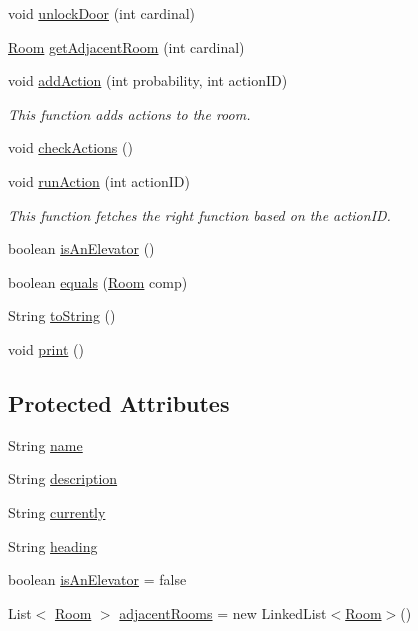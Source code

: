 \begin{DoxyCompactItemize}
\item 
void \hyperlink{classRoom_ace2ee11dd317462ad17dc457109a30f5}{unlock\+Door} (int cardinal)
\item 
\hyperlink{classRoom}{Room} \hyperlink{classRoom_ae10de76a88deb65efbbcd42d1557da68}{get\+Adjacent\+Room} (int cardinal)
\item 
void \hyperlink{classRoom_ab5fed82dacde130f70941779b0b6c7fb}{add\+Action} (int probability, int action\+I\+D)
\begin{DoxyCompactList}\small\item\em This function adds actions to the room. \end{DoxyCompactList}\item 
void \hyperlink{classRoom_acf497ba6df7779bfbc4786dd069d84ef}{check\+Actions} ()
\item 
void \hyperlink{classRoom_a17dc052da1d8f76adf886352d3523d9f}{run\+Action} (int action\+I\+D)
\begin{DoxyCompactList}\small\item\em This function fetches the right function based on the action\+I\+D. \end{DoxyCompactList}\item 
boolean \hyperlink{classRoom_aef1fd9dd031e99eb01947603bca26918}{is\+An\+Elevator} ()
\item 
boolean \hyperlink{classRoom_a2d753b78a122a29c0a6bf9da4fd2dd6b}{equals} (\hyperlink{classRoom}{Room} comp)
\item 
String \hyperlink{classRoom_a257d76391ce0c9999151358143855a84}{to\+String} ()
\item 
void \hyperlink{classRoom_ad090e030e50a028019930016932789eb}{print} ()
\end{DoxyCompactItemize}
\subsection*{Protected Attributes}
\begin{DoxyCompactItemize}
\item 
String \hyperlink{classRoom_a30e9fb0290f64b567572d2f4b4fac4d9}{name}
\item 
String \hyperlink{classRoom_a2d7ecf802690a6b13750ca6fa6882d77}{description}
\item 
String \hyperlink{classRoom_a2f0c64fd0d90618f9c36b935a6f6bb49}{currently}
\item 
String \hyperlink{classRoom_ad9e86528519166f3ac3b1413da4e0a41}{heading}
\item 
boolean \hyperlink{classRoom_a9ae4a56ee28e7e6cae000555032a8e41}{is\+An\+Elevator} = false
\item 
List$<$ \hyperlink{classRoom}{Room} $>$ \hyperlink{classRoom_a9d060d005fd9719f87f5045656fdf7f0}{adjacent\+Rooms} = new Linked\+List$<$\hyperlink{classRoom}{Room}$>$()
\end{DoxyCompactItemize}



